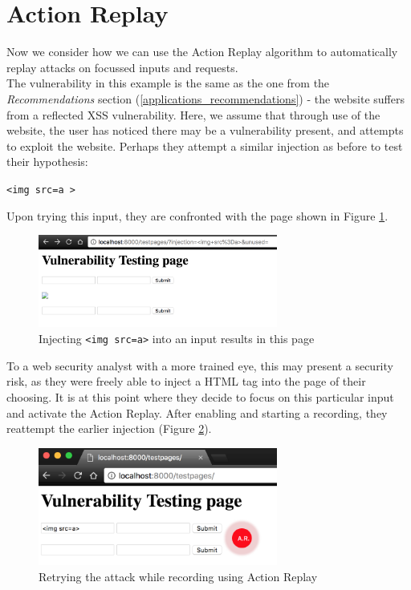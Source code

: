 \section{Action Replay}

Now we consider how we can use the Action Replay algorithm to automatically replay attacks on focussed inputs and requests. \\

The vulnerability in this example is the same as the one from the \textit{Recommendations} section (\ref{applications_recommendations}) - the website suffers from a reflected XSS vulnerability. Here, we assume that through use of the website, the user has noticed there may be a vulnerability present, and attempts to exploit the website. Perhaps they attempt a similar injection as before to test their hypothesis:

\begin{center}
	\texttt{<img src=a >} 
\end{center}

Upon trying this input, they are confronted with the page shown in Figure \ref{fig:action_replay_initial}. \\

\begin{figure}[h!]
	\centering
	\includegraphics[width=0.7\textwidth]{images/action_replay_initial.png}
	\caption{Injecting \texttt{<img src=a>} into an input results in this page}
	\label{fig:action_replay_initial}
\end{figure}

To a web security analyst with a more trained eye, this may present a security risk, as they were freely able to inject a HTML tag into the page of their choosing. It is at this point where they decide to focus on this particular input and activate the Action Replay. After enabling and starting a recording, they reattempt the earlier injection (Figure \ref{fig:action_replay_attack}). \\

\begin{figure}[h!]
	\centering
	\includegraphics[width=0.7\textwidth]{images/action_replay_attack.png}
	\caption{Retrying the attack while recording using Action Replay}
	\label{fig:action_replay_attack}
\end{figure}

